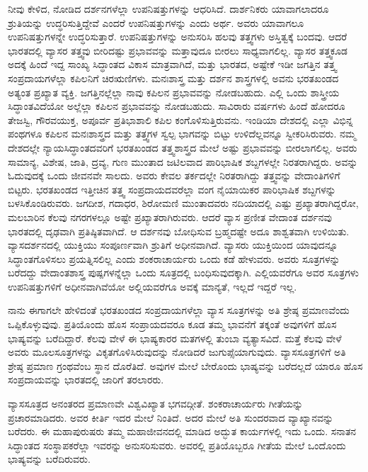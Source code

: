 ನೀವು ಕೇಳಿದ, ನೋಡಿದ ದರ್ಶನಗಳೆಲ್ಲಾ ಉಪನಿಷತ್ತುಗಳನ್ನು ಆಧರಿಸಿದೆ. ದಾರ್ಶನಿಕರು ಯಾವಾಗಲಾದರೂ ಶ್ರುತಿಯನ್ನು ಉದ್ಧರಿಸುತ್ತಿದ್ದೇವೆ ಎಂದರೆ ಉಪನಿಷತ್ತುಗಳನ್ನು ಎಂದು ಅರ್ಥ. ಅವರು ಯಾವಾಗಲೂ ಉಪನಿಷತ್ತುಗಳನ್ನೇ ಉದ್ಧರಿಸುತ್ತಾರೆ. ಉಪನಿಷತ್ತುಗಳನ್ನು ಅನುಸರಿಸಿ ಹಲವು ತತ್ತ್ವಗಳು ಅಸ್ತಿತ್ವಕ್ಕೆ ಬಂದವು. ಆದರೆ ಭಾರತದಲ್ಲಿ ವ್ಯಾಸರ ತತ್ತ್ವವು ಬೀರಿದಷ್ಟು ಪ್ರಭಾವವನ್ನು ಮತ್ತಾವುದೂ ಬೀರಲು ಸಾಧ್ಯವಾಗಲಿಲ್ಲ. ವ್ಯಾಸರ ತತ್ತ್ವಕೂಡ ಅದಕ್ಕೆ ಹಿಂದೆ ಇದ್ದ ಸಾಂಖ್ಯ ಸಿದ್ಧಾಂತದ ವಿಕಾಸ ಮಾತ್ರವಾಗಿದೆ, ಮತ್ತು ಭಾರತದ, ಅಷ್ಟೇಕೆ ಇಡೀ ಜಗತ್ತಿನ ತತ್ತ್ವ ಸಂಪ್ರದಾಯಗಳೆಲ್ಲಾ ಕಪಿಲನಿಗೆ ಚಿರಋಣಿಗಳು. ಮನಃಶಾಸ್ತ್ರ ಮತ್ತು ದರ್ಶನ ಶಾಸ್ತ್ರಗಳಲ್ಲಿ ಅವನು ಭರತಖಂಡದ ಅತ್ಯಂತ ಪ್ರಖ್ಯಾತ ವ್ಯಕ್ತಿ. ಜಗತ್ತಿನಲ್ಲೆಲ್ಲಾ ನಾವು ಕಪಿಲನ ಪ್ರಭಾವವನ್ನು ನೋಡಬಹುದು. ಎಲ್ಲಿ ಒಂದು ಶಾಸ್ತ್ರೀಯ ಸಿದ್ಧಾಂತವಿದೆಯೋ ಅಲ್ಲೆಲ್ಲಾ ಕಪಿಲನ ಪ್ರಭಾವವನ್ನು ನೋಡಬಹುದು. ಸಾವಿರಾರು ವರ್ಷಗಳು ಹಿಂದೆ ಹೋದರೂ ತೇಜಸ್ವಿ, ಗೌರವಯುಕ್ತ, ಅಪೂರ್ವ ಪ್ರತಿಭಾಶಾಲಿ ಕಪಿಲ ಕಂಗೊಳಿಸುತ್ತಿರುವನು. ಇಂಡಿಯಾ ದೇಶದಲ್ಲಿ ಎಲ್ಲಾ ವಿಭಿನ್ನ ಪಂಥಗಳೂ ಕಪಿಲನ ಮನಃಶಾಸ್ತ್ರದ ಮತ್ತು ತತ್ತ್ವಗಳ ಸ್ವಲ್ಪ ಭಾಗವನ್ನು ಬಿಟ್ಟು ಉಳಿದೆಲ್ಲವನ್ನೂ ಸ್ವೀಕರಿಸಿರುವರು. ನಮ್ಮ ದೇಶದಲ್ಲೇ ನ್ಯಾಯಸಿದ್ಧಾಂತದವರಿಗೆ ಭರತಖಂಡದ ತತ್ತ್ವಶಾಸ್ತ್ರದ ಮೇಲೆ ಅಷ್ಟು ಪ್ರಭಾವವನ್ನು ಬೀರಲಾಗಲಿಲ್ಲ. ಅವರು ಸಾಮಾನ್ಯ, ವಿಶೇಷ, ಜಾತಿ, ದ್ರವ್ಯ, ಗುಣ ಮುಂತಾದ ಜಟಿಲವಾದ ಪಾರಿಭಾಷಿಕ ಶಬ್ದಗಳಲ್ಲೇ ನಿರತರಾಗಿದ್ದರು. ಅವನ್ನು ಓದುವುದಕ್ಕೆ ಒಂದು ಜೀವನವೇ ಸಾಲದು. ಅವರು ಕೇವಲ ತರ್ಕದಲ್ಲೇ ನಿರತರಾಗಿದ್ದು ತತ್ತ್ವವನ್ನು ವೇದಾಂತಿಗಳಿಗೆ ಬಿಟ್ಟರು. ಭರತಖಂಡದ ಇತ್ತೀಚಿನ ತತ್ತ್ವ ಸಂಪ್ರದಾಯದವರೆಲ್ಲಾ ವಂಗ ನೈಯಾಯಿಕರ ಪಾರಿಭಾಷಿಕ ಶಬ್ದಗಳನ್ನು ಬಳಸಿಕೊಂಡಿರುವರು. ಜಗದೀಶ, ಗದಾಧರ, ಶಿರೋಮಣಿ ಮುಂತಾದವರು ನದಿಯಾದಲ್ಲಿ ಎಷ್ಟು ಪ್ರಖ್ಯಾತರಾಗಿದ್ದರೋ, ಮಲಬಾರಿನ ಕೆಲವು ನಗರಗಳಲ್ಲೂ ಅಷ್ಟೇ ಪ್ರಖ್ಯಾತರಾಗಿರುವರು. ಆದರೆ ವ್ಯಾಸ ಪ್ರಣೀತ ವೇದಾಂತ ದರ್ಶನವು ಭಾರತದಲ್ಲಿ ದೃಢವಾಗಿ ಪ್ರತಿಷ್ಠಿತವಾಗಿದೆ. ಆ ದರ್ಶನವು ಬೋಧಿಸುವ ಬ್ರಹ್ಮದಷ್ಟೇ ಅದೂ ಶಾಶ್ವತವಾಗಿ ಉಳಿಯಿತು. ವ್ಯಾಸದರ್ಶನದಲ್ಲಿ ಯುಕ್ತಿಯು ಸಂಪೂರ್ಣವಾಗಿ ಶ್ರುತಿಗೆ ಅಧೀನವಾಗಿದೆ. ವ್ಯಾಸರು ಯುಕ್ತಿಯಿಂದ ಯಾವುದನ್ನೂ ಸಿದ್ಧಾಂತಗೊಳಿಸಲು ಪ್ರಯತ್ನಿಸಲಿಲ್ಲ ಎಂದು ಶಂಕರಾಚಾರ್ಯರು ಒಂದು ಕಡೆ ಹೇಳುವರು. ಅವರು ಸೂತ್ರಗಳನ್ನು ಬರೆದದ್ದು ವೇದಾಂತಶಾಸ್ತ್ರ ಪುಷ್ಪಗಳನ್ನೆಲ್ಲಾ ಒಂದು ಸೂತ್ರದಲ್ಲಿ ಬಂಧಿಸುವುದಕ್ಕಾಗಿ. ಎಲ್ಲಿಯವರೆಗೂ ಅವರ ಸೂತ್ರಗಳು ಉಪನಿಷತ್ತುಗಳಿಗೆ ಅಧೀನವಾಗಿವೆಯೋ ಅಲ್ಲಿಯವರೆಗೂ ಅವಕ್ಕೆ ಮಾನ್ಯತೆ, ಇಲ್ಲದೆ ಇದ್ದರೆ ಇಲ್ಲ.

ನಾನು ಈಗಾಗಲೇ ಹೇಳಿದಂತೆ ಭರತಖಂಡದ ಸಂಪ್ರದಾಯಗಳೆಲ್ಲಾ ವ್ಯಾಸ ಸೂತ್ರಗಳನ್ನು ಅತಿ ಶ್ರೇಷ್ಠ ಪ್ರಮಾಣವೆಂದು ಒಪ್ಪಿಕೊಳ್ಳುವುವು. ಪ್ರತಿಯೊಂದು ಹೊಸ ಸಂಪ್ರಾಯದವರೂ ಕೂಡ ತಮ್ಮ ಭಾವನೆಗೆ ತಕ್ಕಂತೆ ಅವುಗಳಿಗೆ ಹೊಸ ಭಾಷ್ಯವನ್ನು ಬರೆದಿದ್ದಾರೆ. ಕೆಲವು ವೇಳೆ ಈ ಭಾಷ್ಯಕಾರರ ಮತಗಳಲ್ಲಿ ತುಂಬಾ ವ್ಯತ್ಯಾಸವಿದೆ. ಮತ್ತೆ ಕೆಲವು ವೇಳೆ ಅವರು ಮೂಲಸೂತ್ರಗಳನ್ನು ವಿಕೃತಗೊಳಿಸಿರುವುದನ್ನು ನೋಡಿದರೆ ಜುಗುಪ್ಸೆಯಾಗುವುದು. ವ್ಯಾಸಸೂತ್ರಗಳಿಗೆ ಅತಿ ಶ್ರೇಷ್ಠ ಪ್ರಮಾಣ ಗ್ರಂಥವೆಂಬ ಸ್ಥಾನ ದೊರೆತಿದೆ. ಅವುಗಳ ಮೇಲೆ ಬೇರೊಂದು ಭಾಷ್ಯವನ್ನು ಬರೆದಲ್ಲದೆ ಯಾರೂ ಹೊಸ ಸಂಪ್ರದಾಯವನ್ನು ಭಾರತದಲ್ಲಿ ಜಾರಿಗೆ ತರಲಾರರು.

ವ್ಯಾಸಸೂತ್ರದ ಅನಂತರದ ಪ್ರಮಾಣವೇ ವಿಶ್ವವಿಖ್ಯಾತ ಭಗವದ್ಗೀತೆ. ಶಂಕರಾಚಾರ್ಯರು ಗೀತೆಯನ್ನು ಪ್ರಚಾರಮಾಡಿದರು. ಅವರ ಕೀರ್ತಿ ಇದರ ಮೇಲೆ ನಿಂತಿದೆ. ಅದರ ಮೇಲೆ ಅತಿ ಸುಂದರವಾದ ವ್ಯಾಖ್ಯಾನವನ್ನು ಬರೆದರು. ಈ ಮಹಾಪುರುಷರು ತಮ್ಮ ಮಹಾಜೀವನದಲ್ಲಿ ಮಾಡಿದ ಅದ್ಭುತ ಕಾರ್ಯಗಳಲ್ಲಿ ಇದು ಒಂದು. ಸನಾತನ ಸಿದ್ಧಾಂತದ ಸಂಸ್ಥಾಪಕರೆಲ್ಲಾ ಇವರನ್ನು ಅನುಸರಿಸುವರು. ಅವರಲ್ಲಿ ಪ್ರತಿಯೊಬ್ಬರೂ ಗೀತೆಯ ಮೇಲೆ ಒಂದೊಂದು ಭಾಷ್ಯವನ್ನು ಬರೆದಿರುವರು.

